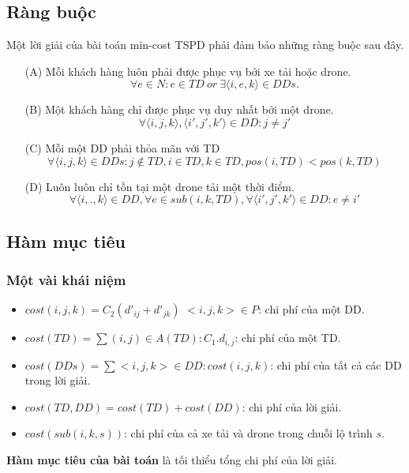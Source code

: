 \documentclass[a4paper,12pt]{report}
\begin{document}
\subsection{Ràng buộc}
Một lời giải của bài toán min-cost \ac{TSPD} phải đảm bảo những ràng buộc sau đây.
\begin{itemize}
\item[(A)]  Mỗi khách hàng luôn phải được phục vụ bởi xe tải hoặc drone. 
\begin{equation} \label{eqn:A}
\forall e \in N: e \in TD \ or \ \exists \langle i,e,k \rangle \in DDs.
\end{equation}
\item[(B)]Một khách hàng chỉ được phục vụ duy nhất bởi một drone.
\begin{equation}\label{eqn:B}
\forall \langle i,j,k\rangle,\langle i',j',k'\rangle \in DD: j \neq j'
\end{equation}
\item[(C)] Mỗi một DD phải thỏa mãn với TD
\begin{equation}\label{eqn:C}
\forall \langle i,j,k \rangle \in DDs:j \not \in TD,i \in TD,k \in TD,pos(i,TD)<pos(k,TD)
\end{equation}
\item[(D)] Luôn luôn chỉ tồn tại một drone tải một thời điểm.
\begin{equation}\label{eqn:D}
\forall \langle i,.,k \rangle \in DD, \forall e \in sub(i,k,TD), \forall \langle i',j',k'\rangle \in DD: e \neq i'
\end{equation}
\end{itemize}
\subsection{Hàm mục tiêu}
\subsubsection{Một vài khái niệm}
\begin{itemize}
\item $cost(i,j,k)=C_2(d'_{ij}+d'_{jk})$ $<i,j,k> \in P$: chi phí của một \ac{DD}.
\item $cost(TD)=\sum(i,j) \in A(TD): C_1.d_{i,j}$: chi phí của một \ac{TD}.
\item $cost(DDs)=\sum<i,j,k> \in DD: cost(i,j,k)$: chi phí của tất cả các \ac{DD} trong lời giải.
\item $cost(TD,DD)=cost(TD)+cost(DD)$: chi phí của lời giải.
\item $cost(sub(i,k,s))$: chi phí của cả xe tải và drone trong chuỗi lộ trình $s$.
\end{itemize}
\textbf{Hàm mục tiêu của bài toán} là tối thiểu tổng chi phí của lời giải.
\end{document}
